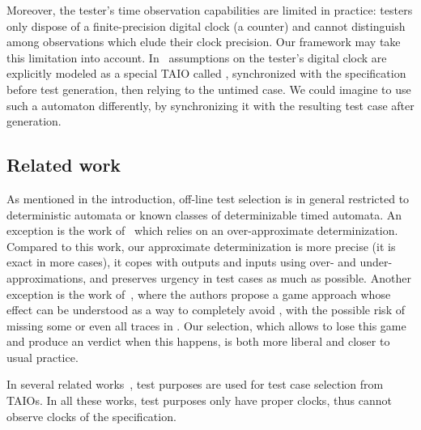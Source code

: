 \documentclass{LMCS}
\theoremstyle{plain}\newtheorem{proposition}[thm]{Proposition}
\begin{document}
Moreover, the tester's time observation capabilities are limited in
practice: testers only dispose of a finite-precision digital clock (a
counter) and cannot distinguish among observations which elude their
clock precision.  Our framework may take this limitation into account.
In~\cite{KrichenTripakis09} assumptions on the tester's digital clock
are explicitly modeled as a special TAIO called , synchronized
with the specification before test generation, then relying to the
untimed case.  We could imagine to use such a  automaton
differently, by synchronizing it with the resulting test case after
generation.



\subsection*{Related work}
As mentioned in the introduction, off-line test selection is in
general restricted to deterministic automata or known classes of
determinizable timed automata.  An exception is the work
of~\cite{KrichenTripakis09} which relies on an over-approximate
determinization.  Compared to this work, our approximate
determinization is more precise (it is exact in more cases), it copes
with outputs and inputs using over- and under-approximations, and
preserves urgency in test cases as much as possible.  Another
exception is the work of~\cite{DavidLarsenLiNielsen-ICST09}, where the
authors propose a game approach whose effect can be understood as a
way to completely avoid , with the possible risk of
missing some or even all traces in
.  Our selection, which allows
to lose this game and produce an  verdict when this happens,
is both more liberal and closer to usual practice.


In several related
works~\cite{KoneCastanetLaurencot-IC3N98,EnNouaryDssouli-Testcom2001},
test purposes are used for test case selection from TAIOs.  In all
these works, test purposes only have proper clocks, thus cannot
observe clocks of the
specification. 
\end{document}
